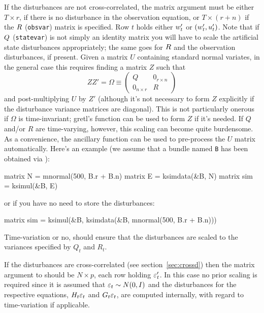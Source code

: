 If the disturbances are not cross-correlated, the matrix argument must
be either $T \times r$, if there is no disturbance in the observation
equation, or $T \times (r+n)$ if the $R$ (\texttt{obsvar})
matrix is specified. Row $t$ holds either $w_t'$ or
$(w_t', u_t')$. Note that if $Q$
(\texttt{statevar}) is not simply an identity matrix you will have to
scale the artificial state disturbances appropriately; the same goes
for $R$ and the observation disturbances, if present. Given a
matrix $U$ containing standard normal variates, in the general case
this requires finding a matrix $Z$ such that
\[
ZZ' = \Omega \equiv \left(
\begin{array}{ll}
Q & 0_{r \times n} \\
0_{n\times r} & R
\end{array}
\right)
\]
and post-multiplying $U$ by $Z'$ (although it's not necessary to form
$Z$ explicitly if the disturbance variance matrices are
diagonal). This is not particularly onerous if $\Omega$ is
time-invariant; gretl's  function can be used to form $Z$
if it's needed. If $Q$ and/or $R$ are time-varying, however, this
scaling can become quite burdensome. As a convenience, the ancillary
function  can be used to pre-process the $U$ matrix
automatically. Here's an example (we assume that a bundle named
\texttt{B} has been obtained via ):
%
\begin{code}
matrix N = mnormal(500, B.r + B.n)
matrix E = ksimdata(&B, N)
matrix sim = ksimul(&B, E)
\end{code}
%
or if you have no need to store the disturbances:
%
\begin{code}
matrix sim = ksimul(&B, ksimdata(&B, mnormal(500, B.r + B.n)))
\end{code}
%
Time-variation or no,  should ensure that the
disturbances are scaled to the variances specified by $Q_t$ and $R_t$.

If the disturbances are cross-correlated (see
section~\ref{sec:crossd}) then the matrix argument to 
should be $N \times p$, each row holding $\varepsilon_t'$. In this case
no prior scaling is required since it is assumed that
$\varepsilon_t \sim N(0, I)$ and the disturbances for the respective
equations, $H_t \varepsilon_t$ and $G_t \varepsilon_t$,
are computed internally, with regard to time-variation if applicable.

